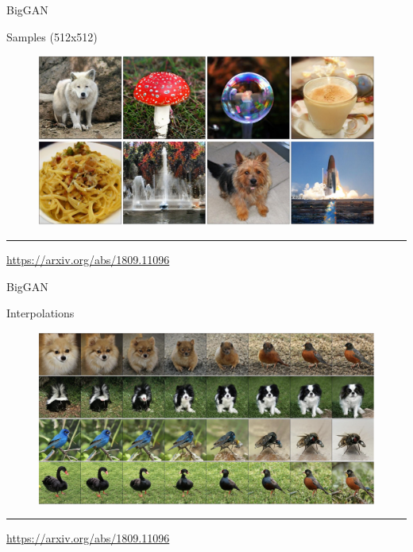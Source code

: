 \documentclass{beamer}
\begin{document}
\begin{frame}{BigGAN}
	\begin{block}{Samples (512x512)}
		\begin{figure}
			\centering
			\includegraphics[width=\linewidth]{figs/biggan_samples}
		\end{figure}
	\end{block}
	\vfill
	\hrule\medskip 
	{\scriptsize \href{https://arxiv.org/abs/1809.11096}{https://arxiv.org/abs/1809.11096}}
\end{frame}
\begin{frame}{BigGAN}
	\begin{block}{Interpolations}
		\begin{figure}
			\centering
			\includegraphics[width=\linewidth]{figs/biggan_interpolations}
		\end{figure}
	\end{block}
	\vfill
	\hrule\medskip 
	{\scriptsize \href{https://arxiv.org/abs/1809.11096}{https://arxiv.org/abs/1809.11096}}
\end{frame}
\end{document}
